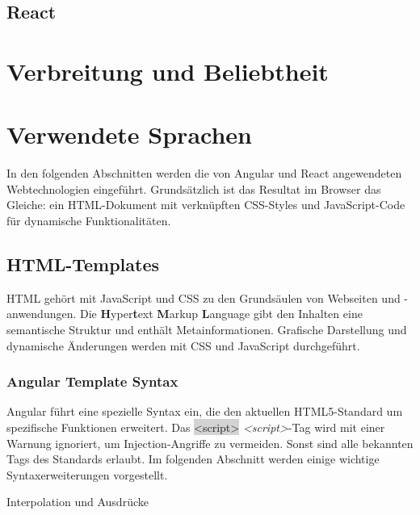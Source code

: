 \subsection{React}

\section{Verbreitung und Beliebtheit}

\section{Verwendete Sprachen}
In den folgenden Abschnitten werden die von Angular und React angewendeten Webtechnologien eingeführt. Grundsätzlich ist das Resultat im Browser das Gleiche: ein HTML-Dokument mit verknüpften CSS-Styles und JavaScript-Code für dynamische Funktionalitäten.

\subsection{HTML-Templates}
HTML gehört mit JavaScript und CSS zu den Grundsäulen von Webseiten und -anwendungen. Die \textbf{H}yper\textbf{t}ext \textbf{M}arkup \textbf{L}anguage gibt den Inhalten eine semantische Struktur und enthält Metainformationen. Grafische Darstellung und dynamische Änderungen werden mit CSS und JavaScript durchgeführt.

\subsubsection{Angular Template Syntax}
Angular führt eine spezielle Syntax ein, die den aktuellen HTML5-Standard um spezifische Funktionen erweitert. Das \colorbox{lightgray}{<script>} \textit{<script>}-Tag wird mit einer Warnung ignoriert, um Injection-Angriffe zu vermeiden. Sonst sind alle bekannten Tags des Standards erlaubt. Im folgenden Abschnitt werden einige wichtige Syntaxerweiterungen vorgestellt.

Interpolation und Ausdrücke

